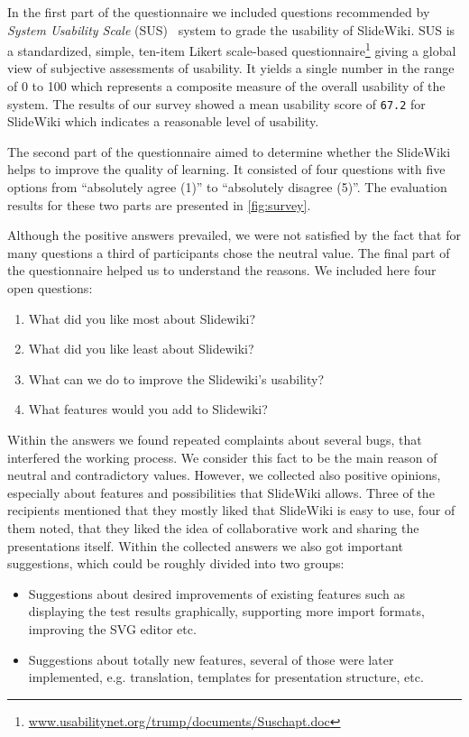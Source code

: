 \documentclass[ngerman,UKenglish,table]{scrbook}
\begin{document}
In the first part of the questionnaire we included questions recommended by \emph{System Usability Scale} (SUS)~\cite{SUS2009} system to grade the usability of SlideWiki.
SUS is a standardized, simple, ten-item Likert scale-based questionnaire\footnote{\url{www.usabilitynet.org/trump/documents/Suschapt.doc}} giving a global view of subjective assessments of usability.
It yields a single number in the range of 0 to 100 which represents a composite measure of the overall usability of the system.
The results of our survey showed a mean usability score of \texttt{67.2} for SlideWiki which indicates a reasonable level of usability.

The second part of the questionnaire aimed to determine whether the SlideWiki helps to improve the quality of learning.
It consisted of four questions with five options from ``absolutely agree (1)''  to ``absolutely disagree (5)''.
The evaluation results for these two parts are presented in \autoref{fig:survey}.

Although the positive answers prevailed, we were not satisfied by the fact that for many questions a third of participants chose the neutral value.
The final part of the questionnaire helped us to understand the reasons.
We included here four open questions:
\small
\begin{enumerate}
	\item What did you like most about Slidewiki?
	\item What did you like least about Slidewiki?
	\item What can we do to improve the Slidewiki's usability?
	\item What features would you add to Slidewiki?
\end{enumerate}

Within the answers we found repeated complaints about several bugs, that interfered the working process.
We consider this fact to be the main reason of neutral and contradictory values.
However, we collected also positive opinions, especially about features and possibilities that SlideWiki allows.
Three of the recipients mentioned that they mostly liked that SlideWiki is easy to use, four of them noted, that they liked the idea of collaborative work and sharing the presentations itself.
Within the collected answers we also got important suggestions, which could be roughly divided into two groups:
\begin{itemize}
	\item Suggestions about desired improvements of existing features such as displaying the test results graphically, supporting more import formats, improving the SVG editor etc.
	\item Suggestions about totally new features, several of those were later implemented, e.g. translation, templates for presentation structure, etc.
\end{itemize}
\end{document}

